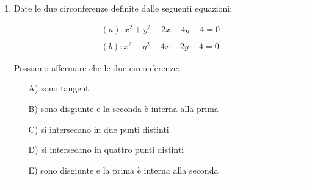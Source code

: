 \begin{enumerate}
\vspace{1cm}
\hrule
\vspace{1cm}


\item  \label{circ_06}

Date le due circonferenze definite dalle seguenti equazioni:

\begin{equation*}
\begin{split}
(a): x^2+y^2-2x-4y-4=0 \\
\\
(b): x^2+y^2-4x-2y+4=0
\end{split}
\end{equation*}

Possiamo affermare che le due circonferenze:

\begin{itemize}
\item[A)] sono tangenti
\item[B)] sono disgiunte e la seconda è interna alla prima
\item[C)] si intersecano in due punti distinti
\item[D)] si intersecano in quattro punti distinti
\item[E)] sono disgiunte e la prima è interna alla seconda
\end{itemize}



\vspace{1cm}
\hrule
\vspace{1cm}


%
%
%
%
%
%
%
%
%
%
%
%


\end{enumerate}

\pagebreak

